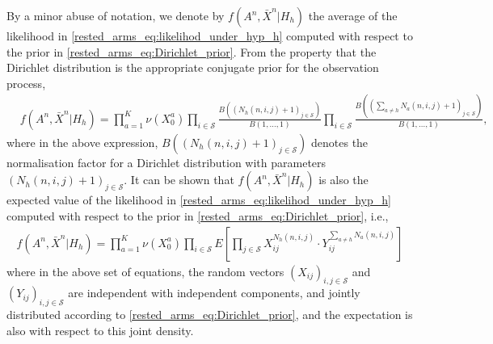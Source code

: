 
By a minor abuse of notation, we denote by $f(A^n,\bar{X}^n|H_h)$ the average of the likelihood in \eqref{rested_arms_eq:likelihod_under_hyp_h} computed with respect to the prior in \eqref{rested_arms_eq:Dirichlet_prior}. From the property that the Dirichlet distribution is the appropriate conjugate prior for the observation process,
\begingroup\allowdisplaybreaks\begin{align}
	&f(A^n,\bar{X}^n|H_h)=\prod\limits_{a=1}^{K}\nu(X_0^a)\prod\limits_{i\in\mathcal{S}}\frac{B((N_h(n,i,j)+1)_{j\in\mathcal{S}})}{B(1,\ldots,1)}
	\prod\limits_{i\in\mathcal{S}}\frac{B\left(\left(\sum\limits_{a\neq h}N_a(n,i,j)+1\right)_{j\in\mathcal{S}}\right)}{B(1,\ldots,1)},\label{rested_arms_eq:f(Z^n,A^n|H_h)}
\end{align}\endgroup
where in the above expression, $B((N_h(n,i,j)+1)_{j\in\mathcal{S}})$ denotes the normalisation factor for a Dirichlet distribution with parameters $(N_h(n,i,j)+1)_{j\in\mathcal{S}}$. It can be shown that  $f(A^n,\bar{X}^n|H_h)$ is also the expected value of the likelihood in \eqref{rested_arms_eq:likelihod_under_hyp_h} computed with respect to the prior in \eqref{rested_arms_eq:Dirichlet_prior}, i.e.,
\begingroup\allowdisplaybreaks\begin{align}
	f(A^n,\bar{X}^n|H_h)
	=\prod\limits_{a=1}^{K}\nu(X_0^a)\prod\limits_{i\in\mathcal{S}}E\left[\prod\limits_{j\in\mathcal{S}}X_{ij}^{N_h(n,i,j)}\cdot Y_{ij}^{\sum\limits_{a\neq h}N_a(n,i,j)}\right]
\end{align}\endgroup
where in the above set of equations, the random vectors $(X_{ij})_{i,j\in\mathcal{S}}$ and $(Y_{ij})_{i,j\in\mathcal{S}}$ are independent with independent components, and jointly distributed according to \eqref{rested_arms_eq:Dirichlet_prior}, and the expectation is also with respect to this joint density.

